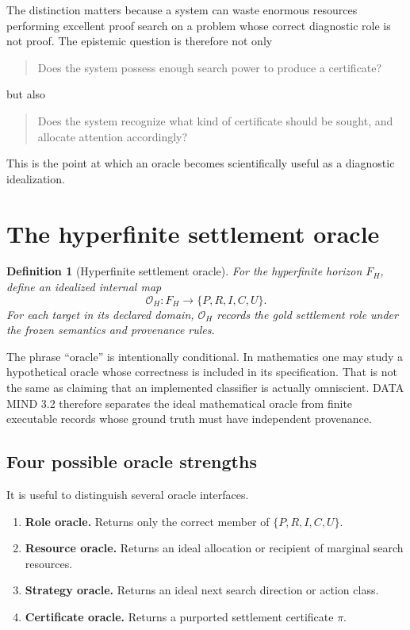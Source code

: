 \documentclass[11pt]{article}
\newtheorem{definition}{Definition}[section]
\begin{document}
The distinction matters because a system can waste enormous resources performing excellent proof search on a problem whose correct diagnostic role is not proof. The epistemic question is therefore not only
\begin{quote}
Does the system possess enough search power to produce a certificate?
\end{quote}
but also
\begin{quote}
Does the system recognize what kind of certificate should be sought, and allocate attention accordingly?
\end{quote}

This is the point at which an oracle becomes scientifically useful as a diagnostic idealization.

\section{The hyperfinite settlement oracle}

\begin{definition}[Hyperfinite settlement oracle]
For the hyperfinite horizon $F_H$, define an idealized internal map
\begin{equation}
\boxed{
\mathscr O_H:F_H\longrightarrow\{P,R,I,C,U\}.
}
\label{eq:oracle}
\end{equation}
For each target in its declared domain, $\mathscr O_H$ records the gold settlement role under the frozen semantics and provenance rules.
\end{definition}

The phrase ``oracle'' is intentionally conditional. In mathematics one may study a hypothetical oracle whose correctness is included in its specification. That is not the same as claiming that an implemented classifier is actually omniscient. DATA MIND 3.2 therefore separates the ideal mathematical oracle from finite executable records whose ground truth must have independent provenance.

\subsection{Four possible oracle strengths}

It is useful to distinguish several oracle interfaces.

\begin{enumerate}[label=\textbf{O\arabic*.},leftmargin=2.3em]
\item \textbf{Role oracle.} Returns only the correct member of $\{P,R,I,C,U\}$.
\item \textbf{Resource oracle.} Returns an ideal allocation or recipient of marginal search resources.
\item \textbf{Strategy oracle.} Returns an ideal next search direction or action class.
\item \textbf{Certificate oracle.} Returns a purported settlement certificate $\pi$.
\end{enumerate}
\end{document}
